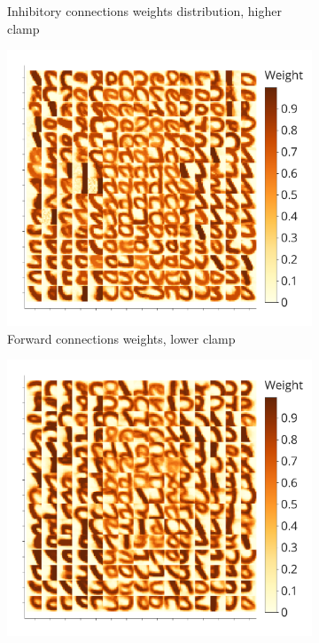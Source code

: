 \documentclass[a4paper]{article}
\begin{document}
\begin{figure}
\begin{subfigure}{0.45\textwidth}
    \caption{Inhibitory connections weights distribution, higher clamp}
\end{subfigure}
\begin{subfigure}{0.45\textwidth}
    \includegraphics[width=\textwidth,keepaspectratio=true]{weights_XY_clamp_low.pdf}
    \caption{Forward connections weights, lower clamp}
\end{subfigure} 
\begin{subfigure}{0.45\textwidth} 
    \includegraphics[width=\textwidth,keepaspectratio=true]{weights_XY_clamp_high.pdf}

\end{subfigure}
\end{figure}
\end{document}
